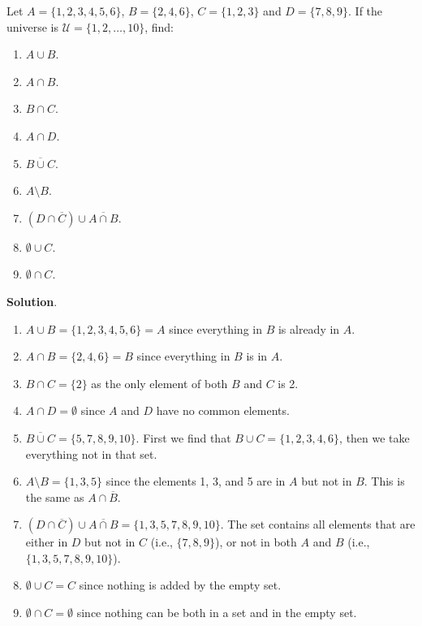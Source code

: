 \documentclass[11pt,]{book}
\theoremstyle{ptxplainnotitle}
\theoremstyle{ptxplaintitle}
\theoremstyle{ptxdefinitionnotitle}
\theoremstyle{ptxdefinitiontitle}
\theoremstyle{ptxdefinitionnotitle}
\theoremstyle{ptxdefinitiontitle}
\theoremstyle{ptxdefinitionnotitle}
\theoremstyle{ptxdefinitiontitle}
\theoremstyle{ptxdefinitiontitlenonumber}
\theoremstyle{ptxdefinitiontitlenonumber}
\numberwithin{equation}{chapter}
\newcommand{\U}{\mathcal U}
\renewcommand{\bar}{\overline}
\begin{document}
\begin{example}\label{example-32}
\hypertarget{p-742}{}%
Let \(A = \{1, 2, 3, 4, 5, 6\}\), \(B = \{2, 4, 6\}\), \(C = \{1, 2, 3\}\) and \(D = \{7, 8, 9\}\). If the universe is \(\U = \{1, 2, \ldots, 10\}\), find: \leavevmode%
\begin{enumerate}
\item\hypertarget{li-312}{}\(A \cup B\).%
\item\hypertarget{li-313}{}\(A \cap B\).%
\item\hypertarget{li-314}{}\(B \cap C\).%
\item\hypertarget{li-315}{}\(A \cap D\).%
\item\hypertarget{li-316}{}\(\bar{B \cup C}\).%
\item\hypertarget{li-317}{}\(A \setminus B\).%
\item\hypertarget{li-318}{}\((D \cap \bar C) \cup \bar{A \cap B}\).%
\item\hypertarget{li-319}{}\(\emptyset \cup C\).%
\item\hypertarget{li-320}{}\(\emptyset \cap C\).%
\end{enumerate}
%
\par\smallskip%
\noindent\textbf{Solution}.\hypertarget{solution-98}{}\quad%
\hypertarget{p-743}{}%
\leavevmode%
\begin{enumerate}
\item\hypertarget{li-321}{}\(A \cup B = \{1, 2, 3, 4, 5, 6\} = A\) since everything in \(B\) is already in \(A\).%
\item\hypertarget{li-322}{}\(A \cap B = \{2, 4, 6\} = B\) since everything in \(B\) is in \(A\).%
\item\hypertarget{li-323}{}\(B \cap C = \{2\}\) as the only element of both \(B\) and \(C\) is 2.%
\item\hypertarget{li-324}{}\(A \cap D = \emptyset\) since \(A\) and \(D\) have no common elements.%
\item\hypertarget{li-325}{}\(\bar{B \cup C} = \{5, 7, 8, 9, 10\}\). First we find that \(B \cup C = \{1, 2, 3, 4, 6\}\), then we take everything not in that set.%
\item\hypertarget{li-326}{}\(A \setminus B = \{1, 3, 5\}\) since the elements 1, 3, and 5 are in \(A\) but not in \(B\). This is the same as \(A \cap \bar B\).%
\item\hypertarget{li-327}{}\((D \cap \bar C) \cup \bar{A \cap B} = \{1, 3, 5, 7, 8, 9, 10\}.\) The set contains all elements that are either in \(D\) but not in \(C\) (i.e., \(\{7,8,9\}\)), or not in both \(A\) and \(B\) (i.e., \(\{1,3,5,7,8,9,10\}\)).%
\item\hypertarget{li-328}{}\(\emptyset \cup C = C\) since nothing is added by the empty set.%
\item\hypertarget{li-329}{}\(\emptyset \cap C = \emptyset\) since nothing can be both in a set and in the empty set.%
\end{enumerate}
%
\end{example}
\end{document}
